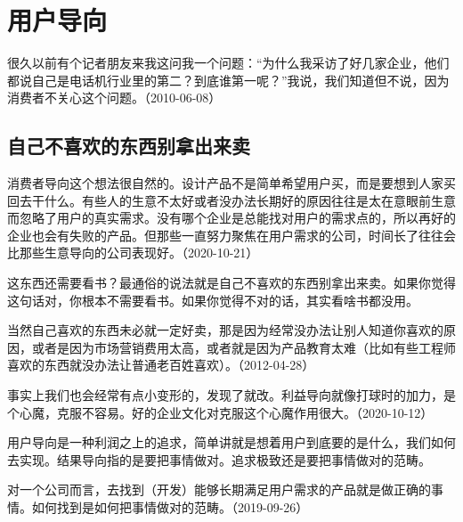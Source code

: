 
\section{用户导向}

很久以前有个记者朋友来我这问我一个问题：“为什么我采访了好几家企业，他们都说自己是电话机行业里的第二？到底谁第一呢？”我说，我们知道但不说，因为消费者不关心这个问题。（2010-06-08）

\subsection{自己不喜欢的东西别拿出来卖}


消费者导向这个想法很自然的。设计产品不是简单希望用户买，而是要想到人家买回去干什么。有些人的生意不太好或者没办法长期好的原因往往是太在意眼前生意而忽略了用户的真实需求。没有哪个企业是总能找对用户的需求点的，所以再好的企业也会有失败的产品。但那些一直努力聚焦在用户需求的公司，时间长了往往会比那些生意导向的公司表现好。（2020-10-21）


这东西还需要看书？最通俗的说法就是自己不喜欢的东西别拿出来卖。如果你觉得这句话对，你根本不需要看书。如果你觉得不对的话，其实看啥书都没用。

当然自己喜欢的东西未必就一定好卖，那是因为经常没办法让别人知道你喜欢的原因，或者是因为市场营销费用太高，或者就是因为产品教育太难（比如有些工程师喜欢的东西就没办法让普通老百姓喜欢）。（2012-04-28）


事实上我们也会经常有点小变形的，发现了就改。利益导向就像打球时的加力，是个心魔，克服不容易。好的企业文化对克服这个心魔作用很大。（2020-10-12）


用户导向是一种利润之上的追求，简单讲就是想着用户到底要的是什么，我们如何去实现。结果导向指的是要把事情做对。追求极致还是要把事情做对的范畴。

对一个公司而言，去找到（开发）能够长期满足用户需求的产品就是做正确的事情。如何找到是如何把事情做对的范畴。（2019-09-26）


